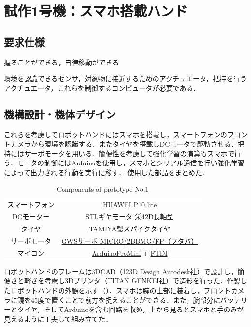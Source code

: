 \chapter{試作1号機：スマホ搭載ハンド}
\newpage

\section{要求仕様}


握ることができる，自律移動ができる

環境を認識できるセンサ，対象物に接近するためのアクチュエータ，把持を行うアクチュエータ，これらを制御するコンピュータが必要である．


\section{機構設計・機体デザイン}

これらを考慮してロボットハンドにはスマホを搭載し，スマートフォンのフロントカメラから環境を認識する．またタイヤを搭載しDCモータで駆動させる．把持にはサーボモータを用いる．簡便性を考慮して強化学習の演算もスマホで行う．モータの制御にはArduinoを使用し，スマホとシリアル通信を行い強化学習によって出力される行動を実行に移す．
使用した部品をまとめた．

\begin{table}[H]
    \centering
    \caption{Components of prototype No.1}
    \begin{tabular}{cc}\toprule
        スマートフォン & HUAWEI P10 lite \\
        DCモーター & \href{http://akizukidenshi.com/catalog/g/gM-12379/}{STLギヤモータ 栄42D長軸型} \\
        タイヤ & \href{https://tamiya.com/japan/products/70194/index.html}{TAMIYA製スパイクタイヤ} \\ 
        サーボモータ & \href{http://akizukidenshi.com/catalog/g/gM-01908/}{GWSサーボ MICRO/2BBMG/FP（フタバ）} \\ 
        マイコン & \href{http://akizukidenshi.com/catalog/g/gK-10347/}{ArduinoProMini} + \href{https://www.switch-science.com/catalog/1032/}{FTDI} \\ \bottomrule
    \end{tabular} 
    \label{tab:1号機部品}
\end{table}

ロボットハンドのフレームは3DCAD（123D Design Autodesk社）で設計し，簡便さと軽さを考慮し3Dプリンタ（TITAN GENKEI社）で造形を行った．作製したロボットハンドの外観を示す（）．スマホは腕の上部に装着し，フロントカメラに鏡を45度で置くことで前方を捉えることができる．また，腕部分にバッテリーとタイヤ，そしてArduinoを含む回路を収め，上から見るとスマホと手のみが見えるように工夫して組み立てた．


